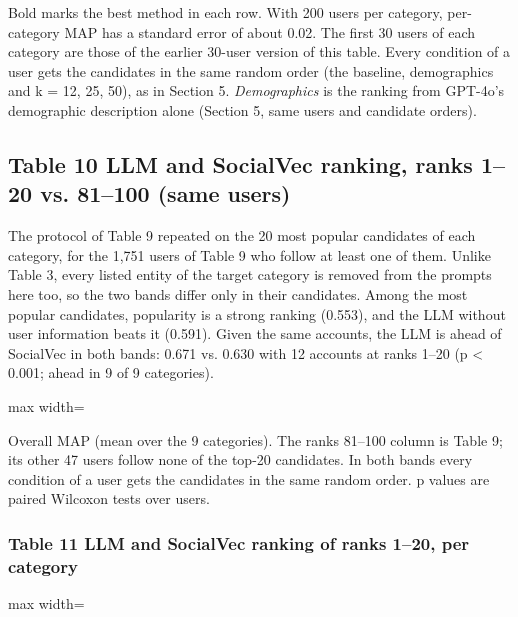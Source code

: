 \documentclass[10pt]{article}
\begin{document}
{\small Bold marks the best method in each row. With 200 users per category, per-category MAP has a standard error of about 0.02. The first 30 users of each category are those of the earlier 30-user version of this table. Every condition of a user gets the candidates in the same random order (the baseline, demographics and k = 12, 25, 50), as in Section 5. \emph{Demographics} is the ranking from GPT-4o's demographic description alone (Section 5, same users and candidate orders).}

\subsection*{Table 10 \textperiodcentered{} LLM and SocialVec ranking, ranks 1--20 vs. 81--100 (same users)}
The protocol of Table 9 repeated on the 20 most popular candidates of each category, for the 1,751 users of Table 9 who follow at least one of them. Unlike Table 3, every listed entity of the target category is removed from the prompts here too, so the two bands differ only in their candidates. Among the most popular candidates, popularity is a strong ranking (0.553), and the LLM without user information beats it (0.591). Given the same accounts, the LLM is ahead of SocialVec in both bands: 0.671 vs. 0.630 with 12 accounts at ranks 1--20 (p \textless{} 0.001; ahead in 9 of 9 categories).

\begin{center}\begin{adjustbox}{max width=\linewidth}

\end{adjustbox}\end{center}

{\small Overall MAP (mean over the 9 categories). The ranks 81--100 column is Table 9; its other 47 users follow none of the top-20 candidates. In both bands every condition of a user gets the candidates in the same random order. p values are paired Wilcoxon tests over users.}

\subsubsection*{Table 11 \textperiodcentered{} LLM and SocialVec ranking of ranks 1--20, per category}
\begin{center}\begin{adjustbox}{max width=\linewidth}

\end{adjustbox}\end{center}
\end{document}
